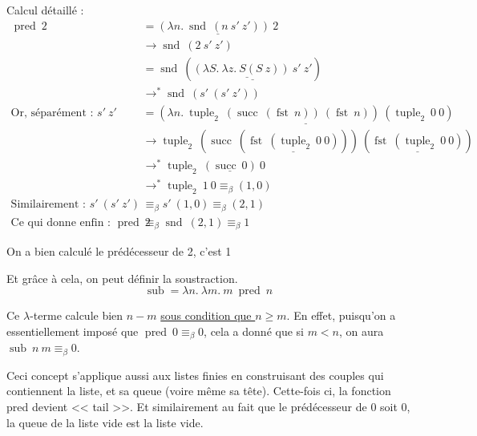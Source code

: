 \documentclass[11pt]{article}
\begin{document}
\begin{example}
    Calcul détaillé :
    \begin{equation*}
    \begin{aligned}
        \operatorname{pred}~2&=\underline{\left(\lambda n.~\operatorname{snd}~\left(n~s'~z'\right)\right) ~2}\\
        &\longrightarrow \operatorname{snd}~\left(2~s'~z'\right)\\
        &=\operatorname{snd}~\left(\underline{\underline{\left(\lambda S.~\lambda z.~ S(S~z)\right)~s'}~z'}\right)\\
        &\longrightarrow^* \operatorname{snd}~\left(s'~(s'~z')\right)\\
        \text{Or, séparément : }s'~z' &= \underline{\left(\lambda n.~\operatorname{tuple}_2~\left(\operatorname{succ}~\left(\operatorname{fst}~n\right)\right)~\left(\operatorname{fst}~n\right)\right)~\left(\operatorname{tuple}_2~0~0\right)}\\
        &\longrightarrow \operatorname{tuple}_2~\left(\operatorname{succ}~\left(\underline{\operatorname{fst}~\left(\operatorname{tuple}_2~0~0\right)}\right)\right)~\left(\underline{\operatorname{fst}~\left(\operatorname{tuple}_2~0~0\right)}\right)\\
        &\longrightarrow^* \operatorname{tuple}_2~\left(\underline{\operatorname{succ}~0}\right)~0\\
        &\longrightarrow^*\operatorname{tuple}_2~1~0 \equiv_\beta (1, 0)\\
        \text{Similairement : }s' ~(s'~z') &\equiv_\beta s'~(1, 0) \equiv_\beta (2, 1)\\
        \text{Ce qui donne enfin : } \operatorname{pred}~2&\equiv_\beta\operatorname{snd}~(2, 1)\equiv_\beta 1
    \end{aligned}
    \end{equation*}

    On a bien calculé le prédécesseur de 2, c'est 1
\end{example}

Et grâce à cela, on peut définir la soustraction.
$$\operatorname{sub} = \lambda n.~\lambda m.~m~\operatorname{pred}~n$$

Ce $\lambda$-terme calcule bien $n-m$ \underline{sous condition que $n\ge m$}. En effet, puisqu'on a essentiellement imposé que $\operatorname{pred}~0\equiv_\beta 0$, cela a donné que si $m < n$, on aura $\operatorname{sub}~n~m\equiv_\beta 0$.

Ceci concept s'applique aussi aux listes finies en construisant des couples qui contiennent la liste, et sa queue (voire même sa tête). Cette-fois ci, la fonction pred devient << tail >>. Et similairement au fait que le prédécesseur de 0 soit 0, la queue de la liste vide est la liste vide.
\end{document}
